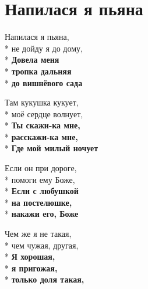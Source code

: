 \section{Напилася я пьяна}
\label{song:Напилася_я_пьяна}

\medskip

\begin{minipage}{\linewidth}
Напилася я пьяна,\\*
не дойду я до дому,\\*
\textbf{Довела меня}\\*
\textbf{тропка дальняя}\\*
\textbf{до вишнёвого сада}\\
\end{minipage}\par\medskip\nobreak

\medskip

\begin{minipage}{\linewidth}
Там кукушка кукует,\\*
моё сердце волнует,\\*
\textbf{Ты скажи-ка мне,}\\*
\textbf{расскажи-ка мне,}\\*
\textbf{Где мой милый ночует}\\
\end{minipage}\par\medskip\nobreak

\medskip

\begin{minipage}{\linewidth}
Если он при дороге,\\*
помоги ему Боже,\\*
\textbf{Если с любушкой}\\*
\textbf{на постелюшке,}\\*
\textbf{накажи его, Боже}\\
\end{minipage}\par\medskip\nobreak

\medskip

\begin{minipage}{\linewidth}
Чем же я не такая,\\*
чем чужая, другая,\\*
\textbf{Я хорошая,}\\*
\textbf{я пригожая,}\\*
\textbf{только доля такая,}\\
\end{minipage}\par\medskip\nobreak

